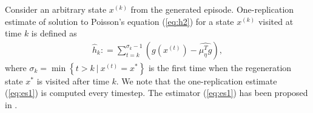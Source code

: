 \documentclass[11pt]{article}
\newcommand{\X}{\mathcal{X}}
\newtheorem{remark}{Remark}
\theoremstyle{definition}
\numberwithin{equation}{section}
\begin{document}
 Consider an arbitrary state $x^{(k)}$ from the generated episode. One-replication estimate of  solution to Poisson's equation (\ref{eq:h2}) for a state $x^{(k)}$ visited at time $k$ is defined as
\begin{align}\label{eq:es1}
\hat h_k: =  \sum\limits_{t=k}^{\sigma_k-1} \left(g(x^{(t) }) - \widehat {\mu_\eta^Tg}  \right) ,
\end{align}
where $\sigma_k = \min\left\{t>k~|~x^{(t)}=x^*\right\}$  is the first time when the regeneration state $x^*$ is visited after time $k$.
We note that the one-replication estimate (\ref{eq:es1}) is computed every timestep. The estimator (\ref{eq:es1}) has been proposed in \cite[Section 5.3]{Cooper2003}.



\end{document}
